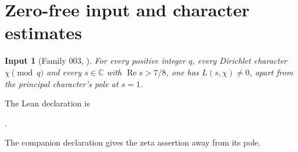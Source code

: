 \documentclass[11pt]{article}
\newtheorem{inputthm}[theorem]{Input}
\theoremstyle{definition}
\newcommand{\C}{\mathbb C}
\DeclareMathOperator{\Rea}{Re}
\theoremstyle{remark}
\begin{document}
\section{Zero-free input and character estimates}\label{sec:characters}

\begin{inputthm}[Family 003, {\cite[Theorem~1.1]{OpenAIQ78}}]\label{input:zf}
For every positive integer $q$, every Dirichlet character $\chi\pmod q$
and every $s\in\C$ with $\Rea s>7/8$, one has $L(s,\chi)\ne0$,
apart from the principal character's pole at $s=1$.
\end{inputthm}
The Lean declaration is
\begin{center}\small
{}.
\end{center}
The companion declaration
gives the zeta assertion away from its pole.
\end{document}
